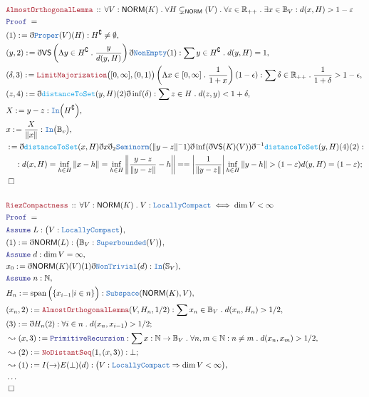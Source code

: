 \documentclass[12pt]{scrartcl}
\newcommand{\TYPE}[1]{\textcolor{NavyBlue}{\mathtt{#1}}}
\newcommand{\FUNC}[1]{\textcolor{Cerulean}{\mathtt{#1}}}
\newcommand{\LOGIC}[1]{\textcolor{Blue}{\mathtt{#1}}}
\newcommand{\THM}[1]{\textcolor{Maroon}{\mathtt{#1}}}
\renewcommand{\.}{\; . \;}
\newcommand{\de}{: \kern 0.1pc =}
\newcommand{\Theorem}[2]{& \THM{#1} \, :: \, #2 \\ & \Proof = \\ }
\newcommand{\NewLine}{\\ & \kern 1pc}
\newcommand{\Page}[1]{\begin{align*} #1 \end{align*} \newpage   }
\newcommand{ \bd }{ \ByDef }
\newcommand{\NoProof}{ & \ldots \\ \EndProof}
\newcommand{\Reals}{\mathbb{R} }
\newcommand{\Nat}{\mathbb{N} }
\renewcommand{\c}{\complement}
\newcommand{\Say}[3]{& #1 \de #2 : #3, \\}
\newcommand{\Conclude}[3]{& #1 \de #2 : #3; \\}
\newcommand{\Derive}[3]{& \leadsto #1 \de #2 : #3, \\}
\newcommand{\DeriveConclude}[3]{& \leadsto #1 \de #2 : #3 ; \\}
\newcommand{\A}{\LOGIC{Assume} \;}
\newcommand{\Assume}[2]{& \A #1 : #2, \\}
\newcommand{\QED}{\; \square}
\newcommand{\EndProof}{& \QED \\}
\newcommand{\ByDef}{\eth}
\newcommand{\Proof}{\LOGIC{Proof} \; }
\DeclareMathOperator{\Span}{span}
\newcommand{\SB}{\TYPE{Superbounded}}
\newcommand{\NORM}{\mathsf{NORM}} %
\begin{document}
\Page{
\Theorem{AlmostOrthogonalLemma}{\forall V : \NORM(K) \. \forall H \subsetneq_\NORM (V) \. \forall \varepsilon \in \Reals_{++} \.
\exists x \in \mathbb{B}_V : d(x,H) > 1 - \varepsilon}
\Say{(1)}{\bd \TYPE{Proper}(V)(H)}{H^\c \neq \emptyset}
\Say{(y,2)}{ \bd \mathsf{VS}\left(\Lambda y \in H^\c \. \frac{y}{d(y,H)}\right) \bd \TYPE{NonEmpty}(1)}{\sum y \in H^\c \. d(y,H) = 1}
\Say{(\delta,3)}{\THM{LimitMajorization}\big([0,\infty],(0,1)\big)
\left( \Lambda x \in [0,\infty] \. \frac{1}{1+x}  \right)(1 - \epsilon)}
{\sum \delta \in \Reals_{++} \. \frac{1}{1 + \delta} > 1 - \epsilon}
\Say{(z,4)}{\bd \FUNC{distanceToSet}(y,H)(2) \bd \inf (\delta)}{ \sum z \in H \. d(z,y) < 1 + \delta}
\Say{ X }{y - z}{\TYPE{In}\Big(H^\c \Big)}
\Say{ x  }{ \frac{X}{\| x \|} }{\TYPE{In}\big( \mathbb{B}_v \big)}
\Conclude{}{ \bd \FUNC{distanceToSet}(x,H)\bd x \bd_2 \TYPE{Seminorm}(\| y - z\|^-1) \bd \inf (\bd \mathsf{VS}(K)(V))
\bd^{-1} \FUNC{distanceToSet}(y,H)(4)(2)
}
{ \NewLine : 
d(x,H) = \inf_{h \in H} \| x - h   \| =  \inf_{h \in H} \left\| \frac{y - z}{\| y - z\| } - h \right\| =
  =  \left| \frac{1}{\| y - z \|} \right| \inf_{h \in H} \| y - h \| > (1 - \varepsilon)d(y,H) = (1 - \varepsilon)   }
\EndProof \\
\Theorem{RiezCompactness}{ \forall V : \NORM(K) \. V : \TYPE{LocallyCompact} \iff \dim V < \infty }
\Assume{L}{\big( V : \TYPE{LocallyCompact}\big)}
\Say{(1)}{\bd \NORM (L)}{\big( \mathbb{B}_V : \SB(V)\big)}
\Assume{d}{\dim V = \infty}
\Say{x_0}{\bd \NORM(K)(V)(1) \bd \TYPE{NonTrivial}(d)}{\TYPE{In}(\mathbb{S}_V)}
\Assume{n}{\Nat}
\Say{H_n}{\Span\Big(\{ x_{i -1} | i \in n \} \Big)}{\TYPE{Subspace}(\NORM(K),V)}
\Say{(x_n,2)}{\THM{AlmostOrthogonalLemma}(V,H_n,1/2)}{\sum x_n \in \mathbb{B}_V \. d(x_n,H_n) > 1/2}
\Conclude{(3)}{\bd H_n(2)}{\forall i \in n \. d(x_n,x_{i - 1}) > 1/2}
\Derive{(x,3)}{\LOGIC{PrimitiveRecursion}}{\sum x : \Nat \to \mathbb{B}_V \. \forall n,m \in \Nat : n \neq m \. d(x_n,x_m) > 1/2}
\DeriveConclude{(2)}{\THM{NoDistantSeq}(1,(x,3))}{\bot}
\Derive{(1)}{I(\rightarrow)E(\bot)(d)}{\big( V : \TYPE{LocallyCompact} \Rightarrow \dim V < \infty \big)}
\NoProof
}
\end{document}
